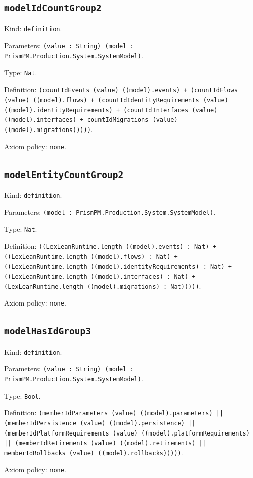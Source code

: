 \documentclass[11pt]{article}
\begin{document}
\subsection*{\texttt{modelIdCountGroup2}}
\noindent Kind: \texttt{definition}.\par
\noindent Parameters: \texttt{(value : String) (model : PrismPM.Production.System.SystemModel)}.\par
\noindent Type: \texttt{Nat}.\par
\noindent Definition: \texttt{(countIdEvents (value) ((model).events) + (countIdFlows (value) ((model).flows) + (countIdIdentityRequirements (value) ((model).identityRequirements) + (countIdInterfaces (value) ((model).interfaces) + countIdMigrations (value) ((model).migrations)))))}.\par
\noindent Axiom policy: \texttt{none}.\par
\subsection*{\texttt{modelEntityCountGroup2}}
\noindent Kind: \texttt{definition}.\par
\noindent Parameters: \texttt{(model : PrismPM.Production.System.SystemModel)}.\par
\noindent Type: \texttt{Nat}.\par
\noindent Definition: \texttt{((LexLeanRuntime.length ((model).events) : Nat) + ((LexLeanRuntime.length ((model).flows) : Nat) + ((LexLeanRuntime.length ((model).identityRequirements) : Nat) + ((LexLeanRuntime.length ((model).interfaces) : Nat) + (LexLeanRuntime.length ((model).migrations) : Nat)))))}.\par
\noindent Axiom policy: \texttt{none}.\par
\subsection*{\texttt{modelHasIdGroup3}}
\noindent Kind: \texttt{definition}.\par
\noindent Parameters: \texttt{(value : String) (model : PrismPM.Production.System.SystemModel)}.\par
\noindent Type: \texttt{Bool}.\par
\noindent Definition: \texttt{(memberIdParameters (value) ((model).parameters) || (memberIdPersistence (value) ((model).persistence) || (memberIdPlatformRequirements (value) ((model).platformRequirements) || (memberIdRetirements (value) ((model).retirements) || memberIdRollbacks (value) ((model).rollbacks)))))}.\par
\noindent Axiom policy: \texttt{none}.\par
\end{document}
